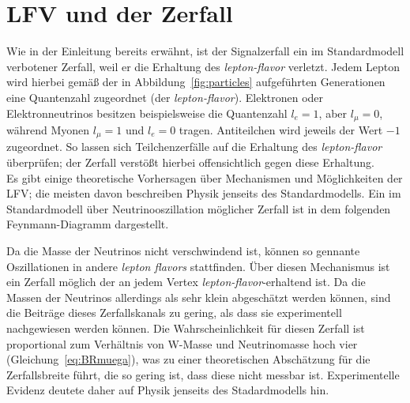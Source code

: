 \section{\texorpdfstring{LFV und der Zerfall \signal}{Jpsi to eµ}}
%
Wie in der Einleitung bereits erwähnt, ist der Signalzerfall \signal ein im Standardmodell verbotener Zerfall, weil er die Erhaltung des \textit{lepton-flavor} verletzt. Jedem Lepton wird hierbei gemäß der in Abbildung~\ref{fig:particles} aufgeführten Generationen eine Quantenzahl zugeordnet (der \textit{lepton-flavor}). Elektronen oder Elektronneutrinos besitzen beispielsweise die Quantenzahl $l_e=1$, aber $l_\mu=0$, während Myonen $l_\mu=1$ und $l_e=0$ tragen. Antiteilchen wird jeweils der Wert $-1$ zugeordnet. So lassen sich Teilchenzerfälle auf die Erhaltung des \textit{lepton-flavor} überprüfen; der Zerfall \signal verstößt hierbei offensichtlich gegen diese Erhaltung.\\
%
Es gibt einige theoretische Vorhersagen über Mechanismen und Möglichkeiten der LFV; die meisten davon beschreiben Physik jenseits des Standardmodells. Ein im Standardmodell über Neutrinooszillation möglicher Zerfall ist in dem folgenden Feynmann-Diagramm dargestellt.
%
\begin{figure}[H]
  \centering
  \label{fig:lfv_nu}
\end{figure}
%
Da die Masse der Neutrinos nicht verschwindend ist, können so gennante Oszillationen in andere \textit{lepton flavors} stattfinden. Über diesen Mechanismus ist ein Zerfall möglich der an jedem Vertex \textit{lepton-flavor}-erhaltend ist. Da die Massen der Neutrinos allerdings als sehr klein abgeschätzt werden können, sind die Beiträge dieses Zerfallskanals zu gering, als dass sie experimentell nachgewiesen werden können. Die Wahrscheinlichkeit für diesen Zerfall ist proportional zum Verhältnis von W-Masse und Neutrinomasse hoch vier (Gleichung~\ref{eq:BRmuega}), was zu einer theoretischen Abschätzung für die Zerfallsbreite führt, die so gering ist, dass diese nicht messbar ist. Experimentelle Evidenz deutete daher auf Physik jenseits des Stadardmodells hin.
